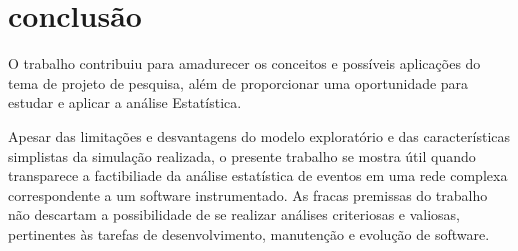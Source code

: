 
\section{conclusão}

O trabalho contribuiu para amadurecer os conceitos e possíveis
aplicações do tema de projeto de pesquisa, além de proporcionar uma oportunidade
para estudar e aplicar a análise Estatística.

Apesar das limitações e desvantagens do modelo exploratório e das
características simplistas da simulação realizada, o presente trabalho se mostra
útil quando transparece a factibiliade da análise estatística de eventos em uma
rede complexa correspondente a um software instrumentado. As fracas premissas do
trabalho não descartam a possibilidade de se realizar análises criteriosas e
valiosas, pertinentes às tarefas de desenvolvimento, manutenção e evolução de
software.
